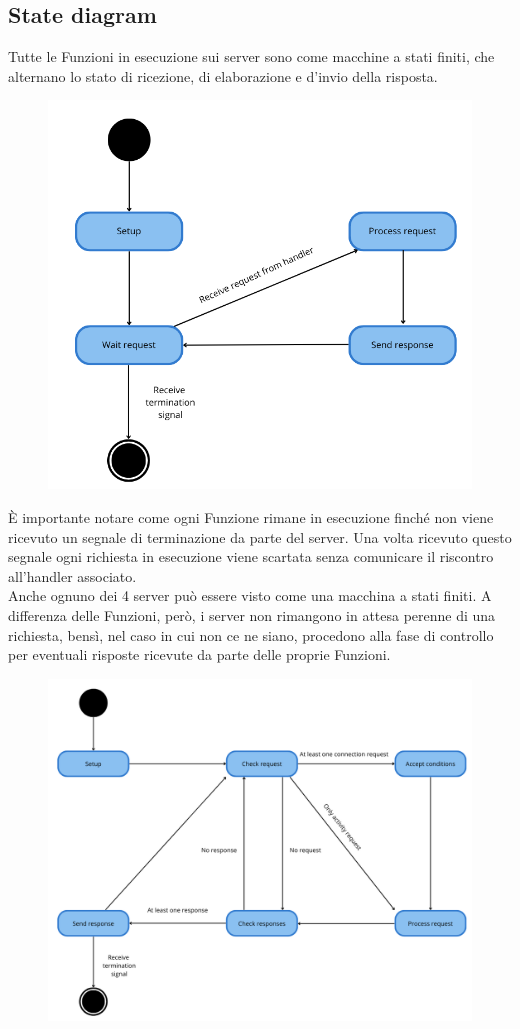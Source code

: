 \documentclass[12pt]{report}
\begin{document}
    \subsection{State diagram}
    Tutte le Funzioni in esecuzione sui server sono come macchine a stati finiti, che alternano lo stato di ricezione, di elaborazione e d'invio della risposta.
    \begin{figure}[H]
        \centering
        \includegraphics[width=0.5\linewidth]{images/StateDiagram1.png}
        \label{statediagram1}
    \end{figure}
    È importante notare come ogni Funzione rimane in esecuzione finché non viene ricevuto un segnale di terminazione da parte del server. Una volta ricevuto questo segnale ogni richiesta in esecuzione viene scartata senza comunicare il riscontro all'handler associato.\\
    Anche ognuno dei 4 server può essere visto come una macchina a stati finiti. A differenza delle Funzioni, però, i server non rimangono in attesa perenne di una richiesta, bensì, nel caso in cui non ce ne siano, procedono alla fase di controllo per eventuali risposte ricevute da parte delle proprie Funzioni.
    \begin{figure}[H]
        \centering
        \includegraphics[width=0.5\linewidth]{images/StateDiagram2.png}
        \label{statediagram2}
    \end{figure}
    
\end{document}
